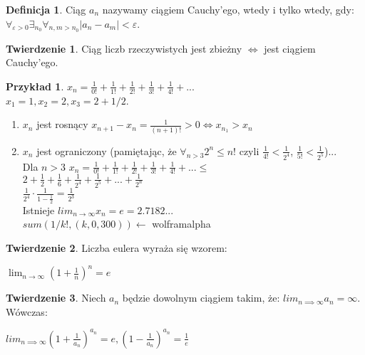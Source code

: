 \documentclass{article}
\theoremstyle{definition}
\newtheorem{de}{Definicja}[subsection]
\theoremstyle{definition}
\newtheorem{tw}{Twierdzenie}[subsection]
\theoremstyle{definition}
\newtheorem{pk}{Przykład}[subsection]
\theoremstyle{definition}
\begin{document}
\begin{de}
Ciąg $a_n$ nazywamy ciągiem Cauchy'ego, wtedy i tylko wtedy, gdy:\\
$\forall_{\varepsilon > 0}\exists_{n_0}\forall_{n,m>n_0} |a_n-a_m|<\varepsilon$.
\end{de}

\begin{tw}
Ciąg liczb rzeczywistych jest zbieżny $\iff$ jest ciągiem Cauchy'ego.
\end{tw}

\begin{pk}
$x_n = \frac{1}{0!} + \frac{1}{1!} + \frac{1}{2!} + \frac{1}{3!} + \frac{1}{4!} + ...$\\
$x_1 = 1, x_2 = 2, x_3 = 2 + 1/2$.
\begin{enumerate}
    \item $x_n$ jest rosnący $x_{n+1}-x_n=\frac{1}{(n+1)!}>0 \iff x_{n_1}>x_n$
    \item $x_n$ jest ograniczony (pamiętając, że $\forall_{n>3} 2^n\leq n!$
    czyli $\frac{1}{4!} < \frac{1}{2^4}$, $\frac{1}{5!} < \frac{1}{2^5}$)...\\
    Dla $n>3$ $x_n=\frac{1}{0!} + \frac{1}{1!} + \frac{1}{2!} + \frac{1}{3!} + \frac{1}{4!} + ...\leq$\\
    $2+\frac{1}{2}+\frac{1}{6}+\frac{1}{2^4}+\frac{1}{2^5}+...+\frac{1}{2^n}$\\
    $\frac{1}{2^4}\cdot\frac{1}{1-\frac{1}{2}}=\frac{1}{2^3}$\\
    Istnieje $lim_{n\rightarrow \infty} x_n = e = 2.7182...$\\
    $sum(1/k!, (k,0,300))\leftarrow$ wolframalpha
\end{enumerate}
\end{pk}

\begin{tw}
    Liczba eulera wyraża się wzorem:
    \begin{center}
    $\lim_{n\rightarrow \infty} (1+\frac{1}{n})^n = e$
    \end{center}
\end{tw}

\begin{tw}
    Niech $a_n$ będzie dowolnym ciągiem takim, że:
    $lim_{n\implies \infty} a_n = \infty$. Wówczas:\\
    \begin{center}
    $lim_{n\implies \infty} (1+\frac{1}{a_n})^{a_n} = e, (1-\frac{1}{a_n})^{a_n} = \frac{1}{e}$
    \end{center}
\end{tw}
\end{document}
